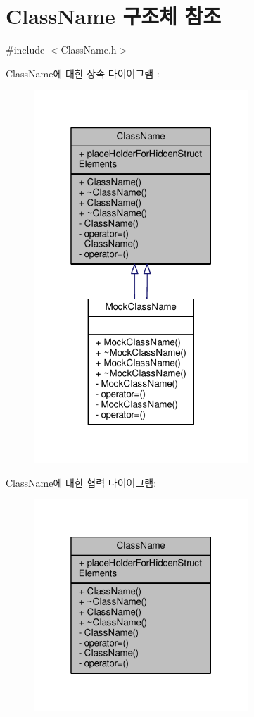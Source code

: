 \hypertarget{class_class_name}{}\section{Class\+Name 구조체 참조}
\label{class_class_name}


{\ttfamily \#include $<$Class\+Name.\+h$>$}



Class\+Name에 대한 상속 다이어그램 \+: 
\nopagebreak
\begin{figure}[H]
\begin{center}
\leavevmode
\includegraphics[width=229pt]{class_class_name__inherit__graph}
\end{center}
\end{figure}


Class\+Name에 대한 협력 다이어그램\+:
\nopagebreak
\begin{figure}[H]
\begin{center}
\leavevmode
\includegraphics[width=229pt]{class_class_name__coll__graph}
\end{center}
\end{figure}
